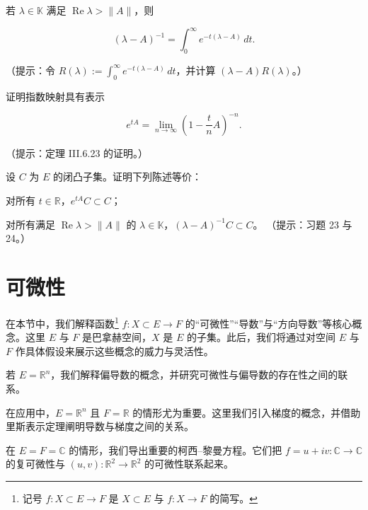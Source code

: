 \begin{exercises}
\item

若 $ \lambda \in \mathbb{K} $ 满足 $ \operatorname{Re}\lambda > \|A\| $，则

\[
(\lambda - A)^{-1} = \int_{0}^{\infty} e^{-t(\lambda - A)} \, dt .
\]

（提示：令 $ R(\lambda) := \int_{0}^{\infty} e^{-t(\lambda - A)} \, dt $，并计算 $ (\lambda - A)R(\lambda) $。）

\item

证明指数映射具有表示

\[
e^{tA} = \lim_{n \to \infty} \left( 1 - \frac{t}{n}A \right)^{-n} .
\]

（提示：定理 III.6.23 的证明。）

\item

设 $ C $ 为 $ E $ 的闭凸子集。证明下列陈述等价：

\begin{subitems}
\item

对所有 $ t \in \mathbb{R} $，$ e^{tA}C \subset C $；

\item

对所有满足 $ \operatorname{Re}\lambda > \|A\| $ 的 $ \lambda \in \mathbb{K} $，$ (\lambda - A)^{-1}C \subset C $。
（提示：习题 23 与 24。）

\end{subitems}

\end{exercises}

\section{可微性}

在本节中，我们解释函数\footnote{记号 $ f : X \subset E \to F $ 是 $ X \subset E $ 与 $ f : X \to F $ 的简写。} $ f : X \subset E \to F $ 的“可微性”“导数”与“方向导数”等核心概念。这里 $ E $ 与 $ F $ 是巴拿赫空间，$ X $ 是 $ E $ 的子集。此后，我们将通过对空间 $ E $ 与 $ F $ 作具体假设来展示这些概念的威力与灵活性。

若 $ E = \mathbb{R}^n $，我们解释偏导数的概念，并研究可微性与偏导数的存在性之间的联系。

在应用中，$ E = \mathbb{R}^n $ 且 $ F = \mathbb{R} $ 的情形尤为重要。这里我们引入梯度的概念，并借助里斯表示定理阐明导数与梯度之间的关系。

在 $ E = F = \mathbb{C} $ 的情形，我们导出重要的柯西–黎曼方程。它们把 $ f = u + iv : \mathbb{C} \to \mathbb{C} $ 的复可微性与 $ (u, v) : \mathbb{R}^2 \to \mathbb{R}^2 $ 的可微性联系起来。

